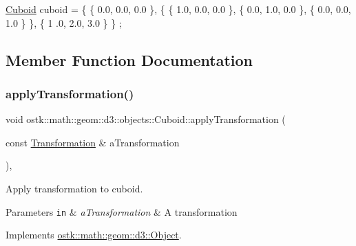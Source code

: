 \begin{DoxyCode}
\hyperlink{classostk_1_1math_1_1geom_1_1d3_1_1objects_1_1_cuboid_a1da071d7cbb0a694348628f098f77c5b}{Cuboid} cuboid = \{ \{ 0.0, 0.0, 0.0 \}, \{ \{ 1.0, 0.0, 0.0 \}, \{ 0.0, 1.0, 0.0 \}, \{ 0.0, 0.0, 1.0 \} \}, \{ 1
      .0, 2.0, 3.0 \} \} ;
\end{DoxyCode}
 

\subsection{Member Function Documentation}
\mbox{\label{classostk_1_1math_1_1geom_1_1d3_1_1objects_1_1_cuboid_aaa90106ccf8120f854bdcf0f824e5610}} 
\subsubsection{\texorpdfstring{apply\+Transformation()}{applyTransformation()}}
{\footnotesize\ttfamily void ostk\+::math\+::geom\+::d3\+::objects\+::\+Cuboid\+::apply\+Transformation (\begin{DoxyParamCaption}\item[{const \hyperlink{classostk_1_1math_1_1geom_1_1d3_1_1_transformation}{Transformation} \&}]{a\+Transformation }\end{DoxyParamCaption})\hspace{0.3cm}{\ttfamily [override]}, {\ttfamily [virtual]}}



Apply transformation to cuboid. 


\begin{DoxyParams}[1]{Parameters}
\mbox{\tt in}  & {\em a\+Transformation} & A transformation \\
\hline
\end{DoxyParams}


Implements \hyperlink{classostk_1_1math_1_1geom_1_1d3_1_1_object_ae9194dd6d2bb4df09292ffc84dccdb1d}{ostk\+::math\+::geom\+::d3\+::\+Object}.

\mbox{\label{classostk_1_1math_1_1geom_1_1d3_1_1objects_1_1_cuboid_a0096ba5626ce44a892f05610f6d6eb13}} 
